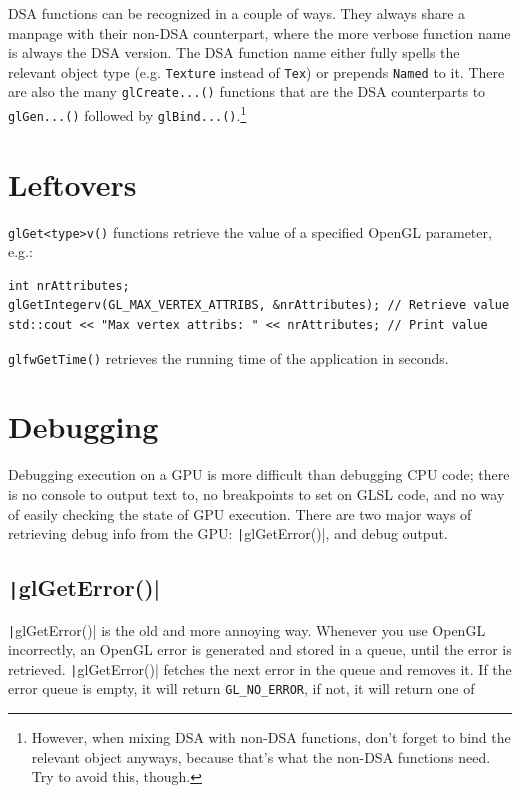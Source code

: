 \documentclass[table, xcdraw]{article}%
\begin{document}
DSA functions can be recognized in a couple of ways. They always share a manpage with their non-DSA counterpart, where the more verbose function name is always the DSA version. The DSA function name either fully spells the relevant object type (e.g. \texttt{Texture} instead of \texttt{Tex}) or prepends \texttt{Named} to it. There are also the many \texttt{glCreate...()} functions that are the DSA counterparts to \texttt{glGen...()} followed by \texttt{glBind...()}.\footnote{However, when mixing DSA with non-DSA functions, don't forget to bind the relevant object anyways, because that's what the non-DSA functions need. Try to avoid this, though.}

\section{Leftovers} \label{leftovers}

\texttt{glGet<type>v()} functions retrieve the value of a specified OpenGL parameter, e.g.:

\begin{verbatim}
int nrAttributes;
glGetIntegerv(GL_MAX_VERTEX_ATTRIBS, &nrAttributes); // Retrieve value
std::cout << "Max vertex attribs: " << nrAttributes; // Print value
\end{verbatim}

\texttt{glfwGetTime()} retrieves the running time of the application in seconds.

\section{Debugging}

Debugging execution on a GPU is more difficult than debugging CPU code; there is no console to output text to, no breakpoints to set on GLSL code, and no way of easily checking the state of GPU execution. There are two major ways of retrieving debug info from the GPU: \texttt|glGetError()|, and debug output.

\subsection{\texttt|glGetError()|}

\texttt|glGetError()| is the old and more annoying way. Whenever you use OpenGL incorrectly, an OpenGL error is generated and stored in a queue, until the error is retrieved. \texttt|glGetError()| fetches the next error in the queue and removes it. If the error queue is empty, it will return \texttt{GL_NO_ERROR}, if not, it will return one of
\end{document}
